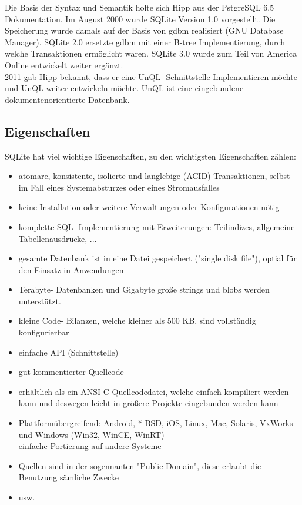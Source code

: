 \documentclass[12pt,a4paper]{report}
\begin{document}
\begin{onehalfspace}
Die Basis der Syntax und Semantik holte sich Hipp aus der PstgreSQL 6.5 Dokumentation. Im August 2000 wurde SQLite Version 1.0 vorgestellt. Die Speicherung wurde damals auf der Basis von gdbm realisiert (GNU Database Manager). SQLite 2.0 ersetzte gdbm mit einer B-tree Implementierung, durch welche Transaktionen ermöglicht waren. SQLite 3.0 wurde zum Teil von America Online entwickelt weiter ergänzt. \\

2011 gab Hipp bekannt, dass er eine UnQL- Schnittstelle Implementieren möchte und UnQL weiter entwickeln möchte. UnQL ist eine eingebundene dokumentenorientierte Datenbank.

\subsection{Eigenschaften}
SQLite hat viel wichtige Eigenschaften, zu den wichtigsten Eigenschaften zählen:
\begin{itemize}
\item atomare, konsistente, isolierte und langlebige (ACID) Transaktionen, selbst im Fall eines Systemabsturzes oder eines Stromausfalles
\item keine Installation oder weitere Verwaltungen oder Konfigurationen nötig
\item komplette SQL- Implementierung mit Erweiterungen: Teilindizes, allgemeine Tabellenausdrücke, ...
\item gesamte Datenbank ist in eine Datei gespeichert ("{}single disk file"{}), optial für den Einsatz in Anwendungen
\item Terabyte- Datenbanken und Gigabyte große strings und blobs werden unterstützt.
\item kleine Code- Bilanzen, welche kleiner als 500 KB, sind vollständig konfigurierbar
\item einfache API (Schnittstelle)
\item gut kommentierter Quellcode
\item erhältlich als ein ANSI-C Quellcodedatei, welche einfach kompiliert werden kann und deswegen leicht in größere Projekte eingebunden werden kann
\item Plattformübergreifend: Android, * BSD, iOS, Linux, Mac, Solaris, VxWorks und Windows (Win32, WinCE, WinRT)\\
einfache Portierung auf andere Systeme
\item Quellen sind in der sogennanten "{}Public Domain"{}, diese erlaubt die Benutzung sämliche Zwecke
\item usw.
\end{itemize}


\end{onehalfspace}
\end{document}
